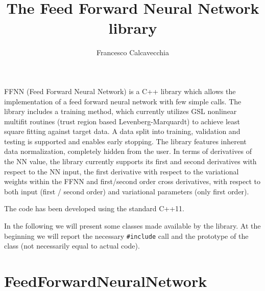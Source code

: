 \documentclass[11pt,a4paper,twoside]{article}
\title{The Feed Forward Neural Network library}
\author{Francesco Calcavecchia}
\begin{document}
\maketitle

FFNN (Feed Forward Neural Network) is a C++ library which allows the implementation of a feed forward neural network with few simple calls.
The library includes a training method, which currently utilizes GSL nonlinear
multifit routines (trust region based Levenberg-Marquardt) to achieve least
square fitting against target data. A data split into training, validation and
testing is supported and enables early stopping. The library features inherent data
normalization, completely hidden from the user.
In terms of derivatives of the NN value, the library currently supports its
first and second derivatives with respect to the NN input, the first derivative with
respect to the variational weights within the FFNN and first/second order cross
derivatives, with respect to both input (first / second order) and variational
parameters (only first order).

The code has been developed using the standard C++11.

In the following we will present some classes made available by the library.
At the beginning we will report the necessary \verb+#include+ call and the
prototype of the class (not necessarily equal to actual code).

\section{FeedForwardNeuralNetwork}
\label{sec:feedforwardneuralnetwork}
\end{document}
